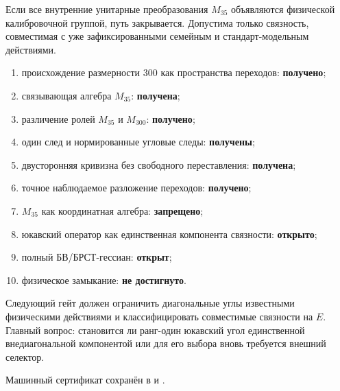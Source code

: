 \begin{nogocriterion}
Если все внутренние унитарные преобразования $M_{35}$ объявляются
физической калибровочной группой, путь закрывается. Допустима только
связность, совместимая с уже зафиксированными семейным и
стандарт-модельным действиями.
\end{nogocriterion}

\begin{protocol}
\begin{enumerate}
 \item происхождение размерности 300 как пространства переходов:
 \textbf{получено};
 \item связывающая алгебра $M_{35}$: \textbf{получена};
 \item различение ролей $M_{35}$ и $M_{300}$: \textbf{получено};
 \item один след и нормированные угловые следы: \textbf{получены};
 \item двусторонняя кривизна без свободного переставления:
 \textbf{получена};
 \item точное наблюдаемое разложение переходов: \textbf{получено};
 \item $M_{35}$ как координатная алгебра: \textbf{запрещено};
 \item юкавский оператор как единственная компонента связности:
 \textbf{открыто};
 \item полный БВ/БРСТ-гессиан: \textbf{открыт};
 \item физическое замыкание: \textbf{не достигнуто}.
\end{enumerate}
\end{protocol}

Следующий гейт должен ограничить диагональные углы известными физическими
действиями и классифицировать совместимые связности на $E$. Главный вопрос:
становится ли ранг-один юкавский угол единственной внедиагональной
компонентой или для его выбора вновь требуется внешний селектор.

Машинный сертификат сохранён в
 и
.